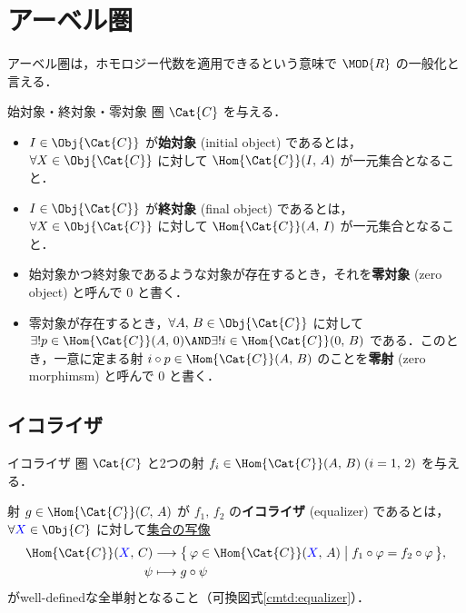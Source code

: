 \documentclass[algtopo_main]{subfiles}
\begin{document}
\setcounter{chapter}{1}

\chapter{アーベル圏}

アーベル圏は，ホモロジー代数を適用できるという意味で $\MOD{R}$ の一般化と言える．

\begin{mydef}[label=def:init-final-zero]{始対象・終対象・零対象}
    圏 $\Cat{C}$ を与える．
    \begin{itemize}
        \item $I \in \Obj{\Cat{C}}$ が\textbf{始対象} (initial object) であるとは，$\forall X \in \Obj{\Cat{C}}$ に対して $\Hom{\Cat{C}}(I,\, A)$ が一元集合となること．
        \item $I \in \Obj{\Cat{C}}$ が\textbf{終対象} (final object) であるとは，$\forall X \in \Obj{\Cat{C}}$ に対して $\Hom{\Cat{C}}(A,\, I)$ が一元集合となること．
        \item 始対象かつ終対象であるような対象が存在するとき，それを\textbf{零対象} (zero object) と呼んで $0$ と書く．
        \item 零対象が存在するとき，$\forall A,\, B \in \Obj{\Cat{C}}$ に対して $\exists ! p \in \Hom{\Cat{C}} (A,\, 0) \AND \exists ! i \in \Hom{\Cat{C}}(0,\, B)$ である．このとき，一意に定まる射 $i \circ p \in \Hom{\Cat{C}} (A,\, B)$ のことを\textbf{零射} (zero morphimsm) と呼んで $0$ と書く．
    \end{itemize}
\end{mydef}

\section{イコライザ}

\begin{mydef}[label=def:equalizer]{イコライザ}
    圏 $\Cat{C}$ と2つの射 $f_i \in \Hom{\Cat{C}}(A,\, B)\; (i=1,\, 2)$ を与える．

    射 $g \in \Hom{\Cat{C}}(C,\, A)$ が $f_1,\, f_2$ の\textbf{イコライザ} (equalizer) であるとは，$\forall \textcolor{blue}{X} \in \Obj{C}$ に対して\underline{集合の写像}
    \begin{align}
        \Hom{\Cat{C}}(\textcolor{blue}{X},\, C) &\lto \bigl\{\, \varphi \in \Hom{\Cat{C}}(\textcolor{blue}{X},\, A) \bigm| f_1 \circ \varphi = f_2 \circ \varphi \,\bigr\}, \\
        \psi &\lmto g \circ \psi
    \end{align}
    がwell-definedな全単射となること（可換図式\ref{cmtd:equalizer}）．
\end{mydef}
\end{document}
